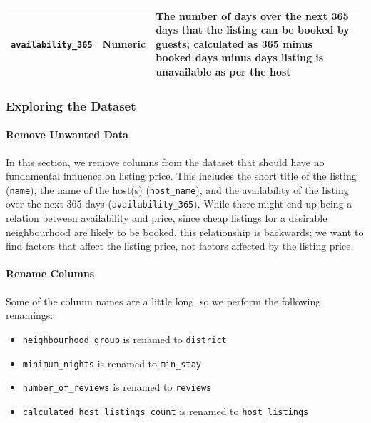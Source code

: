 \documentclass[]{article}
\let\oldparagraph\paragraph
\renewcommand{\paragraph}[1]{\oldparagraph{#1}\mbox{}}
\begin{document}
\begin{longtable}[]{@{}llll@{}}
\begin{minipage}[t]{0.22\columnwidth}
\texttt{availability\_365}\strut
\end{minipage} & \begin{minipage}[t]{0.22\columnwidth}\raggedright
Numeric\strut
\end{minipage} & \begin{minipage}[t]{0.22\columnwidth}\raggedright
The number of days over the next 365 days that the listing can be booked
by guests; calculated as 365 minus booked days minus days listing is
unavailable as per the host\strut
\end{minipage}\tabularnewline
\bottomrule
\end{longtable}

\hypertarget{exploring-the-dataset}{%
\subsubsection{Exploring the Dataset}\label{exploring-the-dataset}}

\hypertarget{remove-unwanted-data}{%
\paragraph{Remove Unwanted Data}\label{remove-unwanted-data}}

In this section, we remove columns from the dataset that should have no
fundamental influence on listing price. This includes the short title of
the listing (\texttt{name}), the name of the host(s)
(\texttt{host\_name}), and the availability of the listing over the next
365 days (\texttt{availability\_365}). While there might end up being a
relation between availability and price, since cheap listings for a
desirable neighbourhood are likely to be booked, this relationship is
backwards; we want to find factors that affect the listing price, not
factors affected by the listing price.

\hypertarget{rename-columns}{%
\paragraph{Rename Columns}\label{rename-columns}}

Some of the column names are a little long, so we perform the following
renamings:

\begin{itemize}
\item
  \texttt{neighbourhood\_group} is renamed to \texttt{district}
\item
  \texttt{minimum\_nights} is renamed to \texttt{min\_stay}
\item
  \texttt{number\_of\_reviews} is renamed to \texttt{reviews}
\item
  \texttt{calculated\_host\_listings\_count} is renamed to
  \texttt{host\_listings}
\end{itemize}
\end{document}
